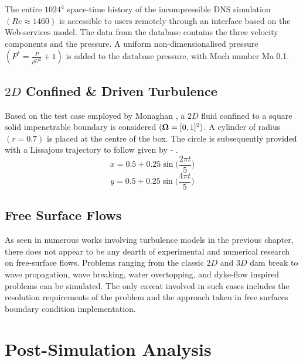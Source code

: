 The entire $1024^4$ space-time history of the incompressible DNS simulation $(Re\approx1460)$ is accessible to users remotely through an interface based on the Web-services model. 
The data from the database contains the three velocity components and the pressure. A uniform non-dimensionalised pressure $(P^* = \frac{P}{\rho U^2} + 1)$ is added to the
database pressure, with Mach number Ma 0.1. 

\subsection[2D Confined and Driven Turbulence]{$2D$ Confined \& Driven Turbulence}
Based on the test case employed by Monaghan \parencite{Monaghan2017}, a $2D$ fluid confined to a square solid impenetrable boundary is considered $(\bm{\Omega} = [0,1]^2)$. A cylinder of radius $(r=0.7)$ is placed at the centre of the box. The circle is subsequently provided with a Lissajous trajectory to follow given by  - .
\begin{equation}
    x = 0.5 + 0.25 \sin \bigg( \frac{2\pi t}{5} \bigg)
    \label{eq:2d-cdt-x}
\end{equation}
\begin{equation}
    y = 0.5 + 0.25 \sin \bigg( \frac{4\pi t}{5} \bigg)
    \label{eq:2d-cdt-y}
\end{equation}

\subsection{Free Surface Flows}
As seen in numerous works involving turbulence models in the previous chapter, there does not appear to be any dearth of experimental and numerical research on free-surface flows. Problems ranging from the classic $2D$ and $3D$ dam break to wave propagation, wave breaking, water overtopping, and dyke-flow inspired problems can be simulated. The only caveat involved in such cases includes the resolution requirements of the problem and the approach taken in free surfaces boundary condition implementation.

\section{Post-Simulation Analysis}
